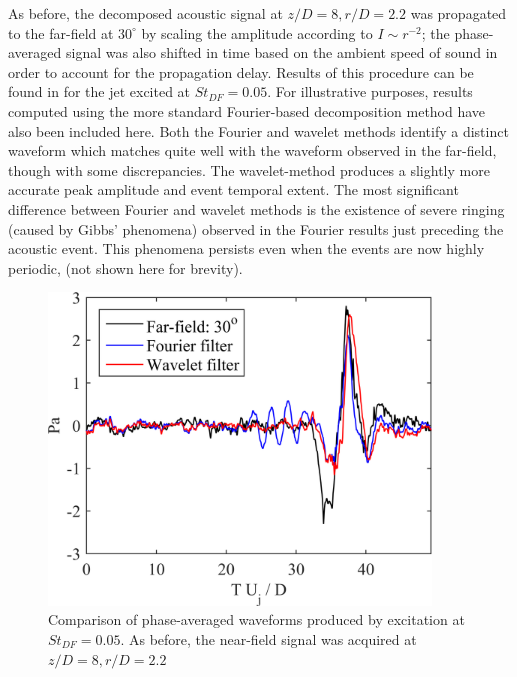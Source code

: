 As before, the decomposed acoustic signal at $z/D = 8, r/D = 2.2$ was propagated to the far-field at $30^\circ$ by scaling the amplitude according to $I \sim r^{-2}$; the phase-averaged signal was also shifted in time based on the ambient speed of sound in order to account for the propagation delay. 
Results of this procedure can be found in  for the jet excited at $St_{DF} = 0.05$. 
For illustrative purposes, results computed using the more standard Fourier-based decomposition method have also been included here.
Both the Fourier and wavelet methods identify a distinct waveform which matches quite well with the waveform observed in the far-field, though with some discrepancies. 
The wavelet-method produces a slightly more accurate peak amplitude and event temporal extent. 
The most significant difference between Fourier and wavelet methods is the existence of severe ringing (caused by Gibbs’ phenomena) observed in the Fourier results just preceding the acoustic event. 
This phenomena persists even when the events are now highly periodic, (not shown here for brevity). 
\begin{figure}
	\centering
	\includegraphics[width=4in]{Figures/ch3_validation_phavg.png}
	\caption{Comparison of phase-averaged waveforms produced by excitation at $St_{DF} = 0.05$. As before, the near-field signal was acquired at $z/D = 8, r/D = 2.2$}
	\label{fig:ch3_validation_phavg}
\end{figure}

